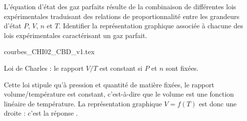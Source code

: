 
\finEntrainement




\newpage




\hauteurLargeurCadreReponse		{7mm}{15mm}
\typeEntrainement				{} %
\initialisationEntrainement

L'équation d'état des gaz parfaits résulte de la combinaison de différentes lois expérimentales traduisant des relations de proportionnalité entre les grandeurs d'état $P$, $V$, $n$ et $T$. Identifier la représentation graphique associée à chacune des lois expérimentales caractérisant un gaz parfait.

\begin{center}
{courbes_CHI02_CBD_v1.tex}
\end{center}


\debutEntrainement



\begin{enonce}
Loi de Charles : le rapport $V/T$ est constant si $P$ et $n$ sont fixées.
\end{enonce}

\reponse{\reponseB}

\begin{corrige}
Cette loi stipule qu'à pression et quantité de matière fixées, le rapport volume/température est constant, c'est-à-dire que le volume est une fonction linéaire de température. La représentation graphique $V=f(T)$ est donc une droite : c'est la réponse \reponseB{}. 
\end{corrige}

